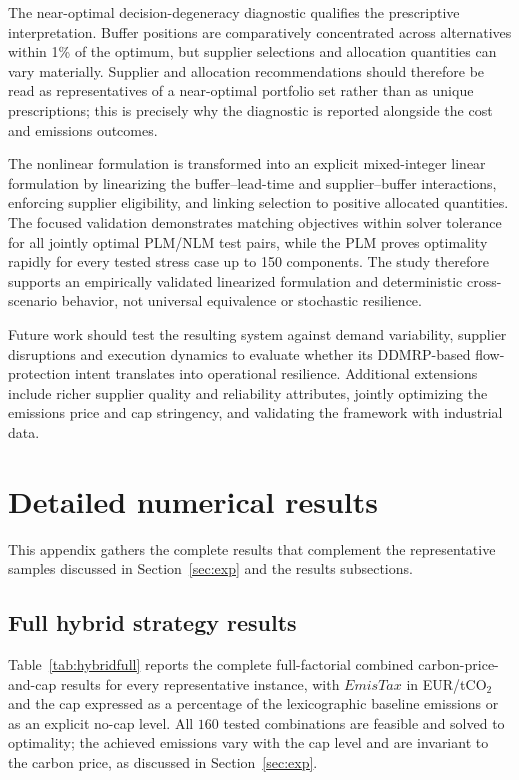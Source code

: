 \documentclass[preprint,12pt,authoryear]{elsarticle}
\begin{document}
The near-optimal decision-degeneracy diagnostic qualifies the prescriptive interpretation. Buffer positions are comparatively concentrated across alternatives within 1\% of the optimum, but supplier selections and allocation quantities can vary materially. Supplier and allocation recommendations should therefore be read as representatives of a near-optimal portfolio set rather than as unique prescriptions; this is precisely why the diagnostic is reported alongside the cost and emissions outcomes.

The nonlinear formulation is transformed into an explicit mixed-integer linear formulation by linearizing the buffer--lead-time and supplier--buffer interactions, enforcing supplier eligibility, and linking selection to positive allocated quantities. The focused validation demonstrates matching objectives within solver tolerance for all jointly optimal PLM/NLM test pairs, while the PLM proves optimality rapidly for every tested stress case up to 150 components. The study therefore supports an empirically validated linearized formulation and deterministic cross-scenario behavior, not universal equivalence or stochastic resilience.

Future work should test the resulting system against demand variability, supplier disruptions and execution dynamics to evaluate whether its DDMRP-based flow-protection intent translates into operational resilience. Additional extensions include richer supplier quality and reliability attributes, jointly optimizing the emissions price and cap stringency, and validating the framework with industrial data.

\appendix
\section{Detailed numerical results}\label{app:results}
This appendix gathers the complete results that complement the representative samples discussed in Section~\ref{sec:exp} and the results subsections.

\subsection{Full hybrid strategy results}
Table~\ref{tab:hybridfull} reports the complete full-factorial combined carbon-price-and-cap results for every representative instance, with $EmisTax$ in EUR/tCO$_2$ and the cap expressed as a percentage of the lexicographic baseline emissions or as an explicit no-cap level. All $160$ tested combinations are feasible and solved to optimality; the achieved emissions vary with the cap level and are invariant to the carbon price, as discussed in Section~\ref{sec:exp}.
\end{document}
